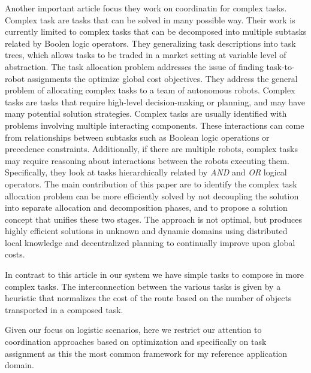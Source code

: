 Another important article \cite{market-based} focus they work on coordinatin for complex tasks.
Complex task are tasks that can be solved in many possible way. Their work is currently 
limited to complex tasks that can be decomposed into multiple subtasks related by Boolen logic operators.
They generalizing task descriptions into task trees, which allows tasks to be traded
in a market setting at variable level of abstraction. 
The task allocation problem addresses the issue of finding task-to-robot assignments the optimize
global cost objectives. 
They address the general problem of allocating complex tasks to a team of autonomous robots.
Complex tasks are tasks that require high-level decision-making or planning,
and may have many potential solution strategies.
Complex tasks are usually identified with problems involving multiple interacting components.
These interactions can come from relationships between subtasks such
as Boolean logic operations or precedence constraints. 
Additionally, if there are multiple robots, complex tasks may
require reasoning about interactions between the robots executing them.
Specifically, they look at tasks hierarchically
related by \textit{AND} and \textit{OR} logical operators.
The main contribution of this paper are to identify the complex task allocation problem
can be more efficiently solved by not decoupling the solution into separate allocation
and decomposition phases, and to propose a solution concept that unifies these two stages.
The approach is not optimal, but produces highly efficient solutions in unknown
and dynamic domains using distributed local knowledge and decentralized planning 
to continually improve upon global costs.

In contrast to this article in our system we have simple tasks to compose in more complex tasks.
The interconnection between the various tasks is given by a heuristic that normalizes the cost of the route 
based on the number of objects transported in a composed task.

Given our focus on logistic scenarios, here we restrict our attention to coordination
approaches based on optimization and specifically on task assignment as this the most 
common framework for my reference application domain.
